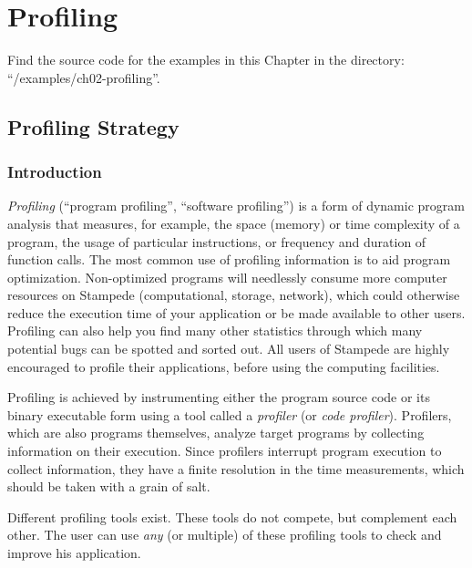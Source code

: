 \chapter{Profiling}
\label{ch:ch02_profiling}

\renewcommand{\exampledir}{examples/ch02-profiling}

\begin{tip}
Find the source code for the examples in this Chapter in the directory:  ``\tilde/\exampledir''.
\end{tip}

\section{Profiling Strategy}
\label{sec:Profiling_Strategy}

\subsection{Introduction}
\label{subsec:Introduction}

\emph{Profiling} (``program profiling'', ``software profiling'') is a form of dynamic program analysis that measures, for example, the space (memory) or time complexity of a program, the usage of particular instructions, or frequency and duration of function calls. The most common use of profiling information is to aid program optimization. Non-optimized programs will needlessly consume more computer resources on Stampede (computational, storage, network), which could otherwise reduce the execution time of your application or be made available to other users. Profiling can also help you find many other statistics through which many potential bugs can be spotted and sorted out. All users of Stampede are highly encouraged to profile their applications, before using the computing facilities.

Profiling is achieved by instrumenting either the program source code or its binary executable form using a tool called a \emph{profiler} (or \emph{code profiler}). Profilers, which are also programs themselves, analyze target programs by collecting information on their execution. Since profilers interrupt program execution to collect information, they have a finite resolution in the time measurements, which should be taken with a grain of salt.

Different profiling tools exist. These tools do not compete, but complement each other. The user can use \emph{any} (or multiple) of these profiling tools to check and improve his application.

